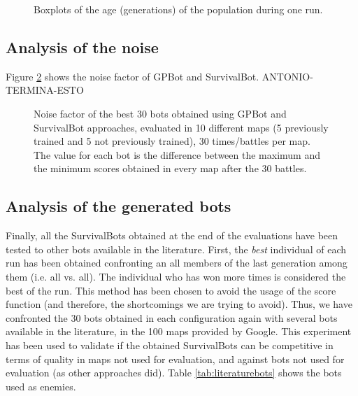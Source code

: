 \documentclass[conference]{IEEEtran}
\begin{document}
\begin{figure}[htb]
\tiny
\begin{center}
\end{center}
\caption{Boxplots of the age (generations) of the population during one run.}

\label{figura:age}
\end{figure}




\subsection{Analysis of the noise}
\label{subsec:analysisnoise}

Figure \ref{figura:noise} shows the noise factor of GPBot and SurvivalBot. ANTONIO-TERMINA-ESTO
\begin{figure}[htb]
\tiny
\begin{center}
\end{center}
\caption{Noise factor of the best 30 bots obtained using GPBot and SurvivalBot approaches, evaluated in 10 different maps (5 previously trained and 5 not previously trained), 30 times/battles per map. The value for each bot is the difference between the maximum and the minimum scores obtained in every map after the 30 battles.}
\label{figura:noise}
\end{figure}





\subsection{Analysis of the generated bots}
\label{subsec:analysisbots}

Finally, all the SurvivalBots obtained at the end of the evaluations have been tested to other bots available in the literature. First, the {\em best} individual of each run has been obtained confronting an all members of the last generation among them (i.e. all vs. all). The individual who has won more times is considered the best of the run. This method has been chosen to avoid the usage of the score function (and therefore, the shortcomings we are trying to avoid). Thus, we have confronted the 30 bots obtained in each configuration again with several bots available in the literature, in the 100 maps provided by Google. This experiment has been used to validate if the obtained SurvivalBots can be competitive in terms of quality in maps not used for evaluation, and against bots not used for evaluation (as other approaches did). Table \ref{tab:literaturebots} shows the bots used as enemies. 
\end{document}
